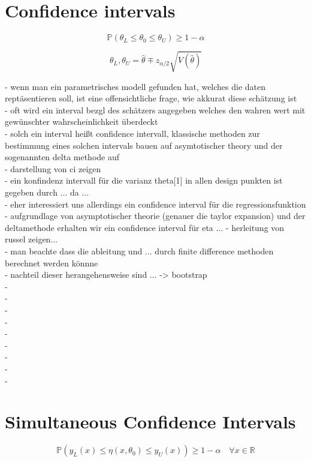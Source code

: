 \section{Confidence intervals}
\begin{equation}
\mathbb{P} \left( \theta_L \le \theta_0 \le \theta_U \right) \geq 1-\alpha
\end{equation}

\begin{equation}
\theta_L, \theta_U = \hat\theta \mp z_{\alpha/2}
\sqrt{
  V(\hat\theta)
}
\end{equation}

- wenn man ein parametrisches modell gefunden hat, welches die daten reptäsentieren soll, ist eine offensichtliche frage, wie akkurat diese schätzung ist\\
- oft wird ein interval bezgl des schätzers angegeben welches den wahren wert mit gewünschter wahrscheinlichkeit überdeckt\\
- solch ein interval heißt confidence intervall, klassische methoden zur bestimmung eines solchen intervals bauen auf asymtotischer theory und der sogenannten delta methode auf\\
- darstellung von ci zeigen\\
- ein konfindenz intervall für die varianz theta[1] in allen design punkten ist gegeben durch ... da ...\\
- eher interessiert uns allerdings ein confidence interval für die regressionsfunktion \\
- aufgrundlage von asymptotischer theorie (genauer die taylor expansion) und der deltamethode erhalten wir ein confidence interval für eta ...
- herleitung von russel zeigen...\\
- man beachte dass die ableitung und ... durch finite difference methoden berechnet werden könnne\\
- nachteil dieser herangehensweise sind ... -> bootstrap\\
- \\
- \\
- \\
- \\
- \\
- \\
- \\
- \\
- \\

\section{Simultaneous Confidence Intervals}
\begin{equation}
\mathbb{P} \left(
  y_L(x) \le \eta(x, \theta_0) \le y_U(x)
\right) \geq 1-\alpha
\quad \forall x \in \mathbb{R}
\end{equation}

